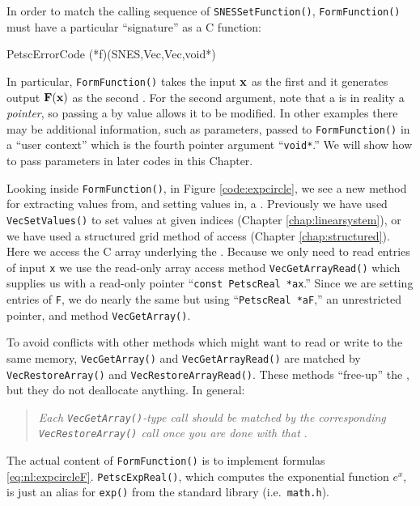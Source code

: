 In order to match the calling sequence of \texttt{SNESSetFunction()}, \texttt{FormFunction()} must have a particular ``signature'' as a C function:
\begin{code}
PetscErrorCode (*f)(SNES,Vec,Vec,void*)
\end{code}
In particular, \texttt{FormFunction()} takes the input $\mathbf{x}$ as the first \pVec and it generates output $\mathbf{F}(\mathbf{x})$ as the second \pVec.  For the second \pVec argument, note that a \pVec is in reality a \emph{pointer}, so passing a \pVec by value allows it to be modified.  In other examples there may be additional information, such as parameters, passed to \texttt{FormFunction()} in a ``user context'' which is the fourth pointer argument ``\texttt{void*}.''  We will show how to pass parameters in later codes in this Chapter.

Looking inside \texttt{FormFunction()}, in Figure \ref{code:expcircle}, we see a new method for extracting values from, and setting values in, a \pVec.  Previously we have used \texttt{VecSetValues()} to set values at given indices (Chapter \ref{chap:linearsystem}), or we have used a \pDMDA structured grid method of access (Chapter \ref{chap:structured}).  Here we access the C array underlying the \pVec.  Because we only need to read entries of input \pVec \texttt{x} we use the read-only array access method \texttt{VecGetArrayRead()} which supplies us with a read-only pointer ``\texttt{const PetscReal *ax}.''  Since we are setting entries of \pVec \texttt{F}, we do nearly the same but using ``\texttt{PetscReal *aF},'' an unrestricted pointer, and method \texttt{VecGetArray()}.

To avoid conflicts with other methods which might want to read or write to the same memory, \texttt{VecGetArray()} and \texttt{VecGetArrayRead()} are matched by \texttt{VecRestoreArray()} and \texttt{VecRestoreArrayRead()}.  These methods ``free-up''  the \pVecs, but they do not deallocate anything.  In general:
\begin{quote}
\emph{Each \emph{\texttt{VecGetArray()}}-type call should be matched by the corresponding \emph{\texttt{VecRestoreArray()}} call once you are done with that \emph{\pVec}}.
\end{quote}

The actual content of \texttt{FormFunction()} is to implement formulas \eqref{eq:nl:expcircleF}.  \texttt{PetscExpReal()}, which computes the exponential function $e^x$, is just an alias for \texttt{exp()} from the standard library (i.e.~\texttt{math.h}).

